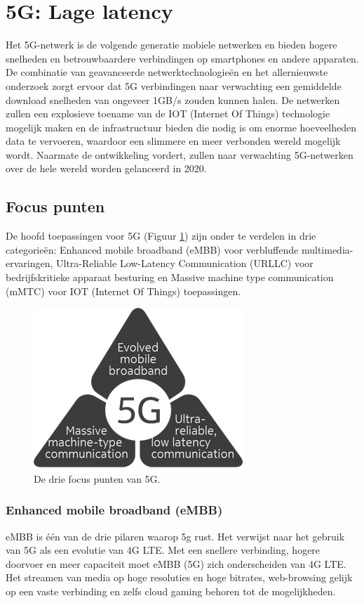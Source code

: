 \documentclass{article}
\begin{document}
\section{5G: Lage latency}
Het 5G-netwerk is de volgende generatie mobiele netwerken en bieden hogere snelheden en betrouwbaardere verbindingen op smartphones en andere apparaten. De combinatie van geavanceerde netwerktechnologieën en het allernieuwste onderzoek zorgt ervoor dat 5G verbindingen naar verwachting een gemiddelde download snelheden van ongeveer 1GB/s zouden kunnen halen. De netwerken zullen een explosieve toename van de IOT (Internet Of Things) technologie mogelijk maken en de infrastructuur bieden die nodig is om enorme hoeveelheden data te vervoeren, waardoor een slimmere en meer verbonden wereld mogelijk wordt. Naarmate de ontwikkeling vordert, zullen naar verwachting 5G-netwerken over de hele wereld worden gelanceerd in 2020. \cite{5g}


\subsection{Focus punten}
De hoofd toepassingen voor 5G (Figuur \ref{fig:5g}) zijn onder te verdelen in drie categorieën: Enhanced mobile broadband (eMBB) voor verbluffende multimedia-ervaringen, Ultra-Reliable Low-Latency Communication (URLLC) voor bedrijfskritieke apparaat besturing en Massive machine type communication (mMTC) voor IOT (Internet Of Things) toepassingen.

\begin{figure}[H]
\centering
\includegraphics[width=0.80 \textwidth]{img/5g.png}
\caption{De drie focus punten van 5G.}
\label{fig:5g}
\end{figure}

\subsubsection{Enhanced mobile broadband (eMBB)}
eMBB is één van de drie pilaren waarop 5g rust. Het verwijst naar het gebruik van 5G als een evolutie van 4G LTE. Met een snellere verbinding, hogere doorvoer en meer capaciteit moet eMBB (5G) zich onderscheiden van 4G LTE. Het streamen van media op hoge resoluties en hoge bitrates, web-browsing gelijk op een vaste verbinding en zelfs cloud gaming behoren tot de mogelijkheden. \cite{spec} \cite{urllc} \cite{5gc}
\end{document}
